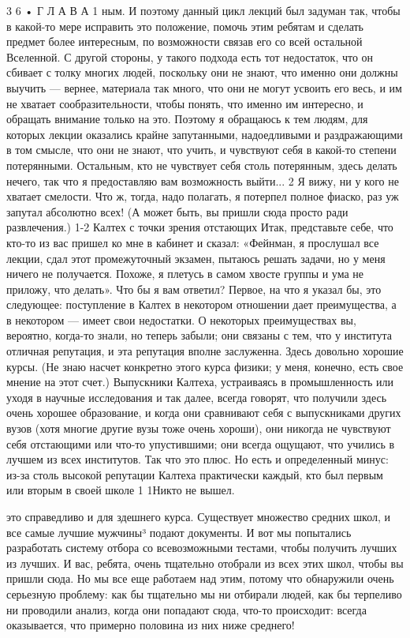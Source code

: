 \documentclass[10pt,oneside]{article}
\begin{document}
3 6 • Г Л А В А  1 ным. И поэтому данный цикл лекций был задуман так, чтобы в какой-то мере исправить это положение, помочь этим ребятам и сделать предмет более интересным, по возможности связав его со всей остальной Вселенной. С другой стороны, у такого подхода есть тот недостаток, что он сбивает с толку многих людей, поскольку они не знают, что именно они должны выучить --- вернее, материала так много, что они не могут усвоить его весь, и им не хватает сообразительности, чтобы понять, что именно им интересно, и обращать внимание только на это. Поэтому я обращаюсь к тем людям, для которых лекции оказались крайне запутанными, надоедливыми и раздражающими в том смысле, что они не знают, что учить, и чувствуют себя в какой-то степени потерянными. Остальным, кто не чувствует себя столь потерянным, здесь делать нечего, так что я предоставляю вам возможность выйти... 2 Я вижу, ни у кого не хватает смелости. Что ж, тогда, надо полагать, я потерпел полное фиаско, раз уж запутал абсолютно всех! (А может быть, вы пришли сюда просто ради развлечения.) 1-2 Калтех с точки зрения отстающих Итак, представьте себе, что кто-то из вас пришел ко мне в кабинет и сказал: «Фейнман, я прослушал все лекции, сдал этот промежуточный экзамен, пытаюсь решать задачи, но у меня ничего не получается. Похоже, я плетусь в самом хвосте группы и ума не приложу, что делать». Что бы я вам ответил? Первое, на что я указал бы, это следующее: поступление в Калтех в некотором отношении дает преимущества, а в некотором --- имеет свои недостатки. О некоторых преимуществах вы, вероятно, когда-то знали, но теперь забыли; они связаны с тем, что у института отличная репутация, и эта репутация вполне заслуженна. Здесь довольно хорошие курсы. (Не знаю насчет конкретно этого курса физики; у меня, конечно, есть свое мнение на этот счет.) Выпускники Калтеха, устраиваясь в промышленность или уходя в научные исследования и так далее, всегда говорят, что получили здесь очень хорошее образование, и когда они сравнивают себя с выпускниками других вузов (хотя многие другие вузы тоже очень хороши), они никогда не чувствуют себя отстающими или что-то упустившими; они всегда ощущают, что учились в лучшем из всех институтов. Так что это плюс. Но есть и определенный минус: из-за столь высокой репутации Калтеха практически каждый, кто был первым или вторым в своей школе 1 1Никто не вышел.\par

это справедливо и для здешнего курса. Существует множество средних школ, и все самые лучшие мужчины³ подают документы. И вот мы попытались разработать систему отбора со всевозможными тестами, чтобы получить лучших из лучших. И вас, ребята, очень тщательно отобрали из всех этих школ, чтобы вы пришли сюда. Но мы все еще работаем над этим, потому что обнаружили очень серьезную проблему: как бы тщательно мы ни отбирали людей, как бы терпеливо ни проводили анализ, когда они попадают сюда, что-то происходит: всегда оказывается, что примерно половина из них ниже среднего!\par
\end{document}

